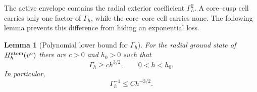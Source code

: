 \documentclass[11pt]{article}
\newtheorem{lemma}[theorem]{Lemma}
\begin{document}
The active envelope contains the radial exterior coefficient $\Gamma_h^2$.  A
core--cusp cell carries only one factor of $\Gamma_h$, while the
core--core cell carries none.  The following lemma prevents this difference
from hiding an exponential loss.

\begin{lemma}[Polynomial lower bound for $\Gamma_h$]\label{lem:Gamma-lower}
For the radial ground state of $H_h^{\rm atom}(v^\circ)$ there are $c>0$ and $h_0>0$ such
that
\begin{equation}\label{eq:Gamma-lower}
 \Gamma_h\ge c h^{3/2},
 \qquad 0<h<h_0.
\end{equation}
In particular,
\begin{equation}\label{eq:Gamma-inverse}
 \Gamma_h^{-1}\le C h^{-3/2}.
\end{equation}
\end{lemma}
\end{document}
